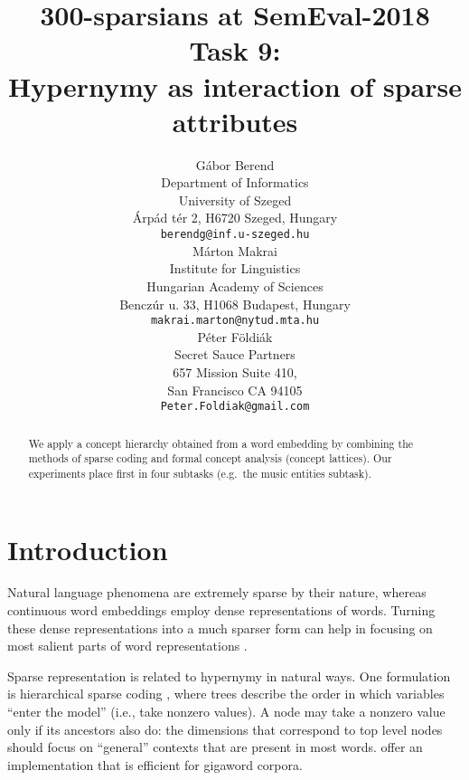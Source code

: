 \documentclass[11pt,a4paper]{article}
\title{300-sparsians at SemEval-2018 Task 9: \\
Hypernymy as interaction of sparse attributes}
\author{Gábor Berend \\
Department of Informatics \\ University of Szeged \\
Árpád tér 2, H6720 Szeged, Hungary \\
{\tt berendg@inf.u-szeged.hu} \\\And
  Márton Makrai  \\
  Institute for Linguistics \\
  Hungarian Academy of Sciences \\
  Benczúr u. 33, H1068 Budapest, Hungary \\
  {\tt makrai.marton@nytud.mta.hu} \\\AND
  Péter Földiák \\
  Secret Sauce Partners \\
  657 Mission Suite 410, \\
  San Francisco CA 94105 \\
  {\tt Peter.Foldiak@gmail.com} \\}
\date{}
\begin{document}
\maketitle

\begin{abstract}
  We apply a concept hierarchy obtained from a word embedding by combining the
  methods of sparse coding and formal concept analysis (concept lattices).
  Our experiments place first in four subtasks (e.g.~the music entities
  subtask).
\end{abstract}




\section{Introduction}

Natural language phenomena are extremely sparse by their nature, whereas
continuous word embeddings employ dense representations of words. Turning
these dense representations into a much sparser form can help in focusing on
most salient parts of word representations
\citep{Faruqui:2015,Berend:2017,Subramanian:2018}.

Sparse representation is related to hypernymy in natural ways.
One formulation is hierarchical sparse coding \citep{Zhao:2009}, where trees
describe the order in which variables “enter the model” (i.e., take nonzero
values). A node may take a nonzero value only if its ancestors also do: the
dimensions that correspond to top level nodes should focus on “general”
contexts that are present in most words. \citet{Yogatama:2015} offer an
implementation that is efficient for gigaword corpora.
\end{document}
